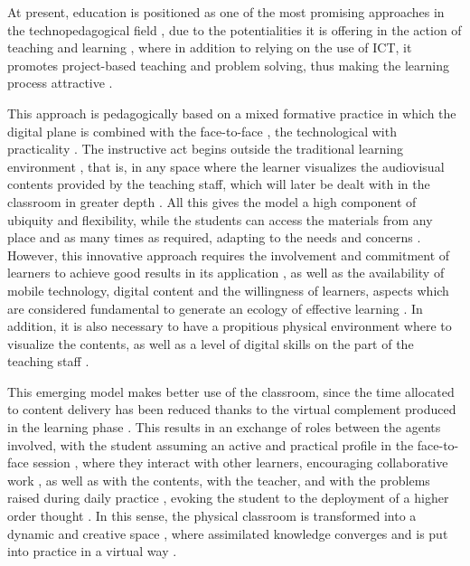 \documentclass{textolivre-html}
\begin{document}
At present, education is positioned as one of the most promising approaches in the technopedagogical field \cite{hinojo_lucena_influencia_2019}, due to the potentialities it is offering in the action of teaching and learning \cite{he_effects_2016}, where in addition to relying on the use of ICT, it promotes project-based teaching and problem solving, thus making the learning process attractive \cite{kostaris_investigating_2017}.

This approach is pedagogically based on a mixed formative practice in which the digital plane is combined with the face-to-face \cite{lee_development_2017}, the technological with practicality \cite{froehlich_non-technological_2018}. The instructive act begins outside the traditional learning environment \cite{borao_moreno_alisis_2016}, that is, in any space where the learner visualizes the audiovisual contents provided by the teaching staff, which will later be dealt with in the classroom in greater depth \cite{el_miedany_flipped_2019,long_use_2017}. All this gives the model a high component of ubiquity and flexibility, while the students can access the materials from any place and as many times as required, adapting to the needs and concerns \cite{blau_re-designed_2017, boelens_design_2018,pereira_young_2019}. However, this innovative approach requires the involvement and commitment of learners to achieve good results in its application \cite{touron_modelo_2015}, as well as the availability of mobile technology, digital content and the willingness of learners, aspects which are considered fundamental to generate an ecology of effective learning \cite{hinojo-lucena_incidence_2018}. In addition, it is also necessary to have a propitious physical environment where to visualize the contents, as well as a level of digital skills on the part of the teaching staff \cite{lopez2019}.

This emerging model makes better use of the classroom, since the time allocated to content delivery has been reduced thanks to the virtual complement produced in the learning phase \cite{bauer-ramazani_flipped_2016}. This results in an exchange of roles between the agents involved, with the student assuming an active and practical profile in the face-to-face session \cite{ahmed_flipped_2016,mortensen_flipped_2015}, where they interact with other learners, encouraging collaborative work \cite{macleod_technological_2018}, as well as  with the contents, with the teacher, and with the problems raised during daily practice \cite{castellanos_sanchez_nuevos_2017,hwang_seamless_2015}, evoking the student to the deployment of a higher order thought \cite{university_of_otago_wellington_new_zealand_just_2017}. In this sense, the physical classroom is transformed into a dynamic and creative space \cite{nouri_flipped_2016}, where assimilated knowledge converges and is put into practice in a virtual way \cite{abeysekera_motivation_2015}.
\end{document}
